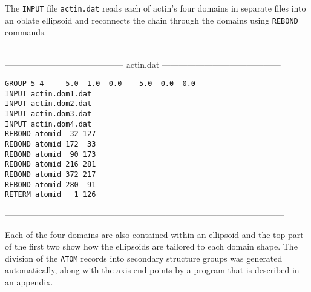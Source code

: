 The {\tt INPUT} file {\tt actin.dat} reads each of actin's four domains in separate files
into an oblate ellipsoid and reconnects the chain through the domains using {\tt REBOND}
commands.

\begin{singlespace}
\ \\
------------------------------------------
actin.dat
------------------------------------------
\begin{verbatim}
GROUP 5 4    -5.0  1.0  0.0    5.0  0.0  0.0
INPUT actin.dom1.dat
INPUT actin.dom2.dat
INPUT actin.dom3.dat
INPUT actin.dom4.dat
REBOND atomid  32 127
REBOND atomid 172  33
REBOND atomid  90 173
REBOND atomid 216 281
REBOND atomid 372 217
REBOND atomid 280  91
RETERM atomid   1 126
\end{verbatim}
---------------------------------------------------------------------------------------------------
\end{singlespace}

Each of the four domains are also contained within an ellipsoid and the top part
of the first two show how the ellipsoids are tailored to each domain shape.
The division of the {\tt ATOM} records into secondary structure groups was generated
automatically, along with the axis end-points by a program that is described in an appendix.

